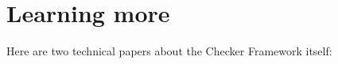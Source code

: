 





% 
% 
% 
% 
% 
% 
% 



\section{Learning more\label{learning-more}}

Here are two technical papers about the Checker Framework itself:


